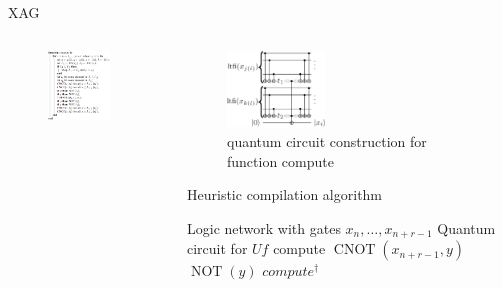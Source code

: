 \begin{frame}{XAG}
  \begin{columns}
    \begin{column}{0.48\linewidth}
      \begin{figure}[h]
        \centering
        \includegraphics[width=0.8\textwidth]{figure/function.png}
        \label{fig-function}
      \end{figure}
    \end{column}
    \begin{column}{0.48\linewidth}
      \begin{figure}[h]
        \centering
        \includegraphics[width=0.4\textwidth]{figure/construction.png}
        \caption{quantum circuit construction for function compute}
        \label{fig-construction}
      \end{figure}
      \begin{algorithm}[H]
         \scriptsize
        \caption{Heuristic compilation algorithm} 
        \label{alg-be} 
        \begin{algorithmic}
          \REQUIRE Logic network with gates $x_n, \dots, x_{n+r-1}$
          \ENSURE Quantum circuit for $Uf$
          \STATE compute
          \STATE $\operatorname{CNOT}(x_{n+r-1},y)$
          \STATE $\operatorname{NOT}(y)$
          \ENDIF
          \STATE $compute^{\dagger}$
        \end{algorithmic} 
      \end{algorithm}
    \end{column}
  \end{columns}
\end{frame}

